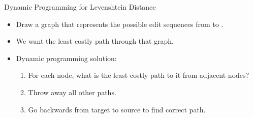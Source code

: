 \documentclass[professionalfonts, xcolor={usenames,svgnames,x11names,table}]{beamer}
\begin{document}
\begin{frame}{Dynamic Programming for Levenshtein Distance}
    \begin{itemize}
        \item Draw a graph that represents the possible edit sequences from  to .
        \item We want the least costly path through that graph.
        \item Dynamic programming solution:
            \begin{enumerate}
                \item For each node, what is the least costly path to it from adjacent nodes?
                \item Throw away all other paths.
                \item Go backwards from target to source to find correct path.
            \end{enumerate}
    \end{itemize}
\end{frame}
\end{document}
